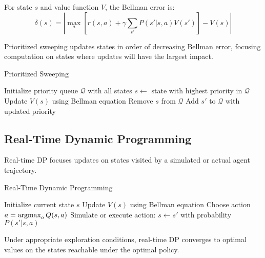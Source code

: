 \begin{definition}
For state $s$ and value function $V$, the Bellman error is:
\begin{equation}
\delta(s) = \left|\max_a \left[r(s,a) + \gamma \sum_{s'} P(s'|s,a) V(s')\right] - V(s)\right|
\end{equation}
\end{definition}

Prioritized sweeping updates states in order of decreasing Bellman error, focusing computation on states where updates will have the largest impact.

\begin{algorithm}
\caption{Prioritized Sweeping}
\begin{algorithmic}
\STATE Initialize priority queue $\mathcal{Q}$ with all states
    \STATE $s \leftarrow$ state with highest priority in $\mathcal{Q}$
    \STATE Update $V(s)$ using Bellman equation
    \STATE Remove $s$ from $\mathcal{Q}$
            \STATE Add $s'$ to $\mathcal{Q}$ with updated priority
        \ENDIF
    \ENDFOR
\ENDWHILE
\end{algorithmic}
\end{algorithm}

\subsection{Real-Time Dynamic Programming}

Real-time DP focuses updates on states visited by a simulated or actual agent trajectory.

\begin{algorithm}
\caption{Real-Time Dynamic Programming}
\begin{algorithmic}
\STATE Initialize current state $s$
\REPEAT
    \STATE Update $V(s)$ using Bellman equation
    \STATE Choose action $a = \operatorname*{argmax}_a Q(s,a)$
    \STATE Simulate or execute action: $s \leftarrow s'$ with probability $P(s'|s,a)$
\end{algorithmic}
\end{algorithm}

\begin{theorem}
Under appropriate exploration conditions, real-time DP converges to optimal values on the states reachable under the optimal policy.
\end{theorem}

